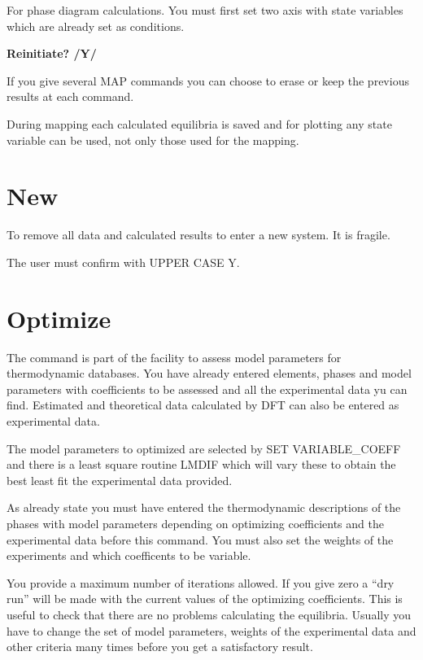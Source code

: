 \documentclass[11pt]{article}
\begin{document}
For phase diagram calculations.  You must first set two axis with
state variables which are already set as conditions.

{\bf Reinitiate? /Y/}

If you give several MAP commands you can choose to erase or keep the
previous results at each command.

During mapping each calculated equilibria is saved and for plotting
any state variable can be used, not only those used for the mapping.

\section{New }
\hypertarget{New}{}

To remove all data and calculated results to enter a new system.  It
is fragile.

The user must confirm with UPPER CASE Y.

\hypertarget{Optimize}{}
\section{Optimize}\label{sc:optim}

The command is part of the facility to assess model parameters for
thermodynamic databases.  You have already entered elements, phases
and model parameters with coefficients to be assessed and all the
experimental data yu can find.  Estimated and theoretical data
calculated by DFT can also be entered as experimental data.

The model parameters to optimized are selected by SET VARIABLE\_COEFF
and there is a least square routine LMDIF which will vary these to
obtain the best least fit the experimental data provided.

As already state you must have entered the thermodynamic descriptions
of the phases with model parameters depending on optimizing
coefficients and the experimental data before this command.  You must
also set the weights of the experiments and which coefficents to be
variable.

You provide a maximum number of iterations allowed.  If you give zero
a ``dry run'' will be made with the current values of the optimizing
coefficients.  This is useful to check that there are no problems
calculating the equilibria.  Usually you have to change the set of
model parameters, weights of the experimental data and other criteria
many times before you get a satisfactory result.
\end{document}

